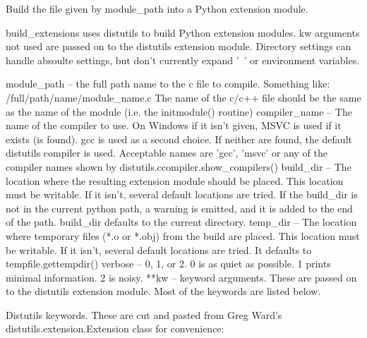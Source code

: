 \begin{DoxyVerb}Build the file given by module_path into a Python extension module.

    build_extensions uses distutils to build Python extension modules.
    kw arguments not used are passed on to the distutils extension
    module.  Directory settings can handle absoulte settings, but don't
    currently expand '~' or environment variables.

    module_path   -- the full path name to the c file to compile.
                     Something like:  /full/path/name/module_name.c
                     The name of the c/c++ file should be the same as the
                     name of the module (i.e. the initmodule() routine)
    compiler_name -- The name of the compiler to use.  On Windows if it
                     isn't given, MSVC is used if it exists (is found).
                     gcc is used as a second choice. If neither are found,
                     the default distutils compiler is used. Acceptable
                     names are 'gcc', 'msvc' or any of the compiler names
                     shown by distutils.ccompiler.show_compilers()
    build_dir     -- The location where the resulting extension module
                     should be placed. This location must be writable.  If
                     it isn't, several default locations are tried.  If the
                     build_dir is not in the current python path, a warning
                     is emitted, and it is added to the end of the path.
                     build_dir defaults to the current directory.
    temp_dir      -- The location where temporary files (*.o or *.obj)
                     from the build are placed. This location must be
                     writable.  If it isn't, several default locations are
                     tried.  It defaults to tempfile.gettempdir()
    verbose       -- 0, 1, or 2.  0 is as quiet as possible. 1 prints
                     minimal information.  2 is noisy.
    **kw          -- keyword arguments. These are passed on to the
                     distutils extension module.  Most of the keywords
                     are listed below.

    Distutils keywords.  These are cut and pasted from Greg Ward's
    distutils.extension.Extension class for convenience:


\end{DoxyVerb}
